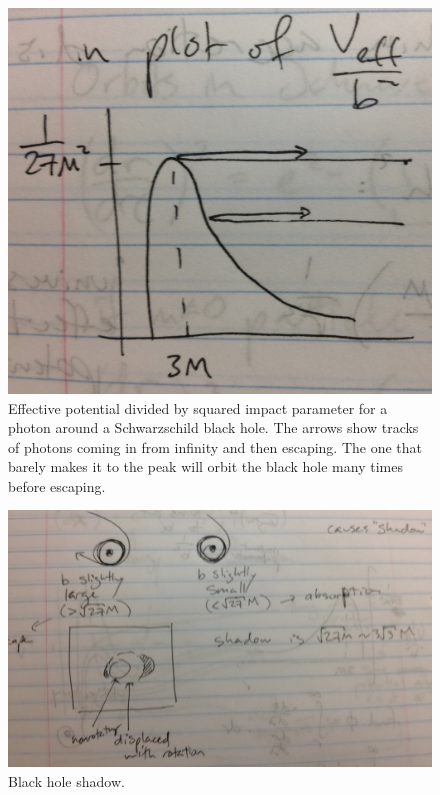 \begin{figure}[!h]
\begin{center}
\includegraphics[width=\textwidth]{veff_phot.jpg}
\caption{Effective potential divided by squared impact parameter for a photon around a Schwarzschild black hole. The arrows show tracks of photons coming in from infinity and then escaping. The one that barely makes it to the peak will orbit the black hole many times before escaping. \label{f:veff_phot}}
\end{center}
\end{figure}

\begin{figure}[!h]
\begin{center}
\includegraphics[width=\textwidth]{bh_shadow.jpg}
\caption{Black hole shadow. \label{f:bh_shadow}}
\end{center}
\end{figure}

